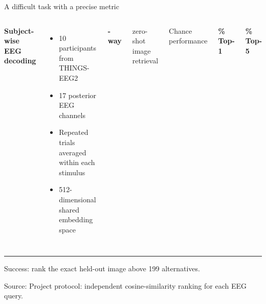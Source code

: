 \documentclass[aspectratio=169,11pt]{beamer}
\newcommand{\sourcefooter}[1]{%
  \vfill
  {\color{Muted}\fontsize{8.5}{10}\selectfont Source: #1\par}
}
\begin{document}

\begin{frame}{A difficult task with a precise metric}
  \vspace{0.08cm}
  \begin{columns}[T,onlytextwidth]
      {\color{Navy}\bfseries\fontsize{20}{24}\selectfont Subject-wise EEG decoding\par}
      \vspace{0.25cm}
      \begin{itemize}
        \item 10 participants from THINGS-EEG2
        \item 17 posterior EEG channels
        \item Repeated trials averaged within each stimulus
        \item 512-dimensional shared embedding space
      \end{itemize}

      {\color{Orange}\bfseries\fontsize{34}{38}-way\par}
      {\fontsize{16}{20}\selectfont zero-shot image retrieval\par}
      \vspace{0.48cm}
      {\color{Muted}\fontsize{14}{18}\selectfont Chance performance\par}
      \vspace{0.08cm}
      {\color{Navy}\bfseries\fontsize{21}{25}\% Top-1\par}
      {\color{Navy}\bfseries\fontsize{21}{25}\% Top-5\par}
  \end{columns}

  \vspace{0.08cm}
  {\color{Teal}\rule{\textwidth}{2.4pt}}
  \vspace{0.08cm}
  {\fontsize{13}{16}\selectfont
    Success: rank the exact held-out image above 199 alternatives.
  \par}
  \sourcefooter{Project protocol: independent cosine-similarity ranking for each EEG query.}
\end{frame}
\end{document}
